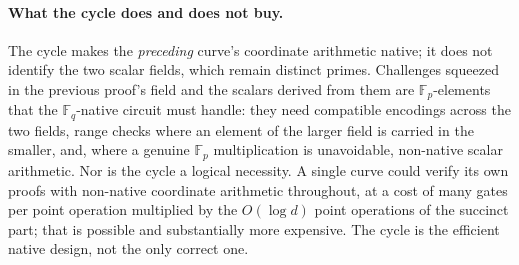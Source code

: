 \documentclass[11pt,a4paper]{article}
\theoremstyle{definition}
\newcommand{\F}{\mathbb{F}}
\begin{document}
\paragraph{What the cycle does and does not buy.}
The cycle makes the \emph{preceding} curve's coordinate arithmetic
native; it does not identify the two scalar fields, which remain
distinct primes. Challenges squeezed in the previous proof's field and
the scalars derived from them are $\F_p$-elements that the
$\F_q$-native circuit must handle: they need compatible encodings
across the two fields, range checks where an element of the larger
field is carried in the smaller, and, where a genuine $\F_p$
multiplication is unavoidable, non-native scalar arithmetic. Nor is the
cycle a logical necessity. A single curve could verify its own proofs
with non-native coordinate arithmetic throughout, at a cost of many
gates per point operation multiplied by the $O(\log d)$ point
operations of the succinct part; that is possible and substantially
more expensive. The cycle is the efficient native design, not the only
correct one.
\end{document}
